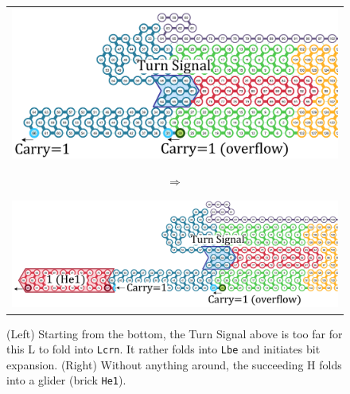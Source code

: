 \documentclass[twocolumn]{svjour3}
\begin{document}
\begin{figure}[tb]
\begin{tabular}{c}
 \begin{minipage}{0.4\linewidth}
\centering
\includegraphics[width=\linewidth]{CounterEx14_2.pdf}
\end{minipage}
\begin{minipage}{0.05\linewidth}
\centering
{\large $\Rightarrow$}
\end{minipage}
 \begin{minipage}{0.5\linewidth}
\centering
\includegraphics[width=\linewidth]{CounterEx15_2.pdf}
\end{minipage}
\end{tabular}

\caption{
(Left) Starting from the bottom, the Turn Signal above is too far for this L to fold into \texttt{Lcrn}.
It rather folds into \texttt{Lbe} and initiates bit expansion.
(Right) Without anything around, the succeeding H folds into a glider (brick \texttt{He1}).
}
\label{fig:overflowex2-3}
\end{figure}
\end{document}
